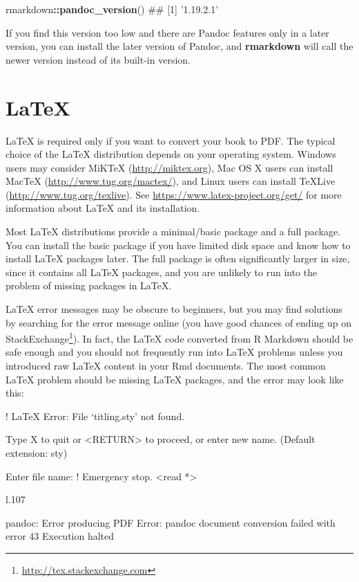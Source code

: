 \documentclass[12pt,]{krantz}
\makeatletter
\newenvironment{Shaded}{\begin{snugshade}}{\end{snugshade}}
\newcommand{\KeywordTok}[1]{\textcolor[rgb]{0.13,0.29,0.53}{\textbf{#1}}}
\newcommand{\OperatorTok}[1]{\textcolor[rgb]{0.81,0.36,0.00}{\textbf{#1}}}
\newcommand{\NormalTok}[1]{#1}
\renewcommand{\href}[2]{#2\footnote{\url{#1}}}
\newenvironment{kframe}{%
\medskip{}
\setlength{\fboxsep}{.8em}
 \def\at@end@of@kframe{}%
 \ifinner\ifhmode%
  \def\at@end@of@kframe{\end{minipage}}%
  \begin{minipage}{\columnwidth}%
 \fi\fi%
 \def\FrameCommand##1{\hskip\@totalleftmargin \hskip-\fboxsep
 \colorbox{shadecolor}{##1}\hskip-\fboxsep
     \hskip-\linewidth \hskip-\@totalleftmargin \hskip\columnwidth}%
 \MakeFramed {\advance\hsize-\width
   \@totalleftmargin\z@ \linewidth\hsize
   \@setminipage}}%
 {\par\unskip\endMakeFramed%
 \at@end@of@kframe}
\renewenvironment{Shaded}{\begin{kframe}}{\end{kframe}}
\theoremstyle{definition}
\theoremstyle{definition}
\theoremstyle{definition}
\theoremstyle{remark}
\makeatother
\begin{document}
\begin{Shaded}
\begin{Highlighting}[]
\NormalTok{rmarkdown}\OperatorTok{::}\KeywordTok{pandoc_version}\NormalTok{()}
\NormalTok{## [1] '1.19.2.1'}
\end{Highlighting}
\end{Shaded}

If you find this version too low and there are Pandoc features only in a
later version, you can install the later version of Pandoc, and
\textbf{rmarkdown} will call the newer version instead of its built-in
version.

\section{LaTeX}\label{latex}

LaTeX is required only if you want to convert your book to
PDF. The typical choice of the LaTeX distribution depends on your
operating system. Windows users may consider MiKTeX
(\url{http://miktex.org}), Mac OS X users can install MacTeX
(\url{http://www.tug.org/mactex/}), and Linux users can install TeXLive
(\url{http://www.tug.org/texlive}). See
\url{https://www.latex-project.org/get/} for more information about
LaTeX and its installation.

Most LaTeX distributions provide a minimal/basic package and a full
package. You can install the basic package if you have limited disk
space and know how to install LaTeX packages later. The full package is
often significantly larger in size, since it contains all LaTeX
packages, and you are unlikely to run into the problem of missing
packages in LaTeX.

LaTeX error messages may be obscure to beginners, but you may find
solutions by searching for the error message online (you have good
chances of ending up on
\href{http://tex.stackexchange.com}{StackExchange}). In fact, the LaTeX
code converted from R Markdown should be safe enough and you should not
frequently run into LaTeX problems unless you introduced raw LaTeX
content in your Rmd documents. The most common LaTeX problem should be
missing LaTeX packages, and the error may look like this:

\begin{Shaded}
\begin{Highlighting}[]
\NormalTok{! LaTeX Error: File `titling.sty' not found.}

\NormalTok{Type X to quit or <RETURN> to proceed,}
\NormalTok{or enter new name. (Default extension: sty)}

\NormalTok{Enter file name: }
\NormalTok{! Emergency stop.}
\NormalTok{<read *> }
         
\NormalTok{l.107 ^^M}

\NormalTok{pandoc: Error producing PDF}
\NormalTok{Error: pandoc document conversion failed with error 43}
\NormalTok{Execution halted}
\end{Highlighting}
\end{Shaded}
\end{document}
